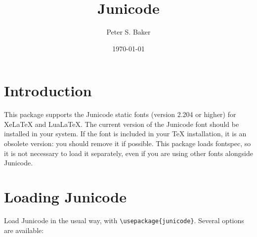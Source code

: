 \documentclass{article}
\title{Junicode}
\author{Peter S. Baker}
\date{\today}
\newcommand{\fspec}{{\sffamily fontspec}}
\begin{document}
\maketitle

\section{Introduction}

This package supports the Junicode static fonts (version 2.204 or higher)
for XeLaTeX and LuaLaTeX. The current version of the Junicode font should
be installed in your system. If the font is included in your TeX installation,
it is an obsolete version: you should remove it if possible. This package loads
\fspec, so it is not necessary to load it separately, even if you are using
other fonts alongside Junicode.

\section{Loading Junicode}

Load Junicode in the usual way, with {\verb|\usepackage{junicode}|}. Several options are available:
\end{document}
